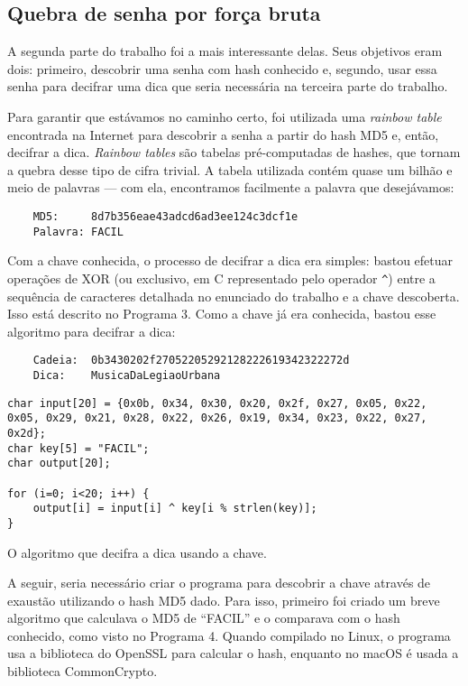 \documentclass{sig-alternate-05-2015}
\begin{document}
\subsection{Quebra de senha por força bruta}
A segunda parte do trabalho foi a mais interessante delas.
Seus objetivos eram dois: primeiro, descobrir uma senha com hash conhecido e, segundo, usar essa senha para decifrar uma dica que seria necessária na terceira parte do trabalho.

Para garantir que estávamos no caminho certo, foi utilizada uma \textit{rainbow table} encontrada na Internet para descobrir a senha a partir do hash MD5 e, então, decifrar a dica.
\textit{Rainbow tables} são tabelas pré-computadas de hashes, que tornam a quebra desse tipo de cifra trivial.
A tabela utilizada contém quase um bilhão e meio de palavras — com ela, encontramos facilmente a palavra que desejávamos:

\begin{verbatim}
	MD5:     8d7b356eae43adcd6ad3ee124c3dcf1e
	Palavra: FACIL
\end{verbatim}

Com a chave conhecida, o processo de decifrar a dica era simples: bastou efetuar operações de XOR (ou exclusivo, em C representado pelo operador \texttt{\^}) entre a sequência de caracteres detalhada no enunciado do trabalho e a chave descoberta.
Isso está descrito no Programa 3.
Como a chave já era conhecida, bastou esse algoritmo para decifrar a dica:

\begin{verbatim}
	Cadeia:  0b3430202f27052205292128222619342322272d
	Dica:    MusicaDaLegiaoUrbana
\end{verbatim}

\begin{program}
\begin{lstlisting}
char input[20] = {0x0b, 0x34, 0x30, 0x20, 0x2f, 0x27, 0x05, 0x22, 0x05, 0x29, 0x21, 0x28, 0x22, 0x26, 0x19, 0x34, 0x23, 0x22, 0x27, 0x2d};
char key[5] = "FACIL";
char output[20];

for (i=0; i<20; i++) {
    output[i] = input[i] ^ key[i % strlen(key)];
}
\end{lstlisting}
\caption{O algoritmo que decifra a dica usando a chave.}
\end{program}

A seguir, seria necessário criar o programa para descobrir a chave através de exaustão utilizando o hash MD5 dado.
Para isso, primeiro foi criado um breve algoritmo que calculava o MD5 de ``FACIL'' e o comparava com o hash conhecido, como visto no Programa 4.
Quando compilado no Linux, o programa usa a biblioteca do OpenSSL para calcular o hash, enquanto no macOS é usada a biblioteca CommonCrypto.
\end{document}
